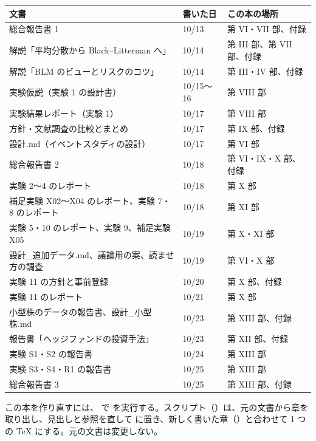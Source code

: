 \begin{longtable}{P{6.4cm}P{3.0cm}P{5.2cm}}
\toprule
\textbf{文書} & \textbf{書いた日} & \textbf{この本の場所} \\
\midrule
\endhead
\bottomrule
\endfoot
総合報告書 1 & 10/13 & 第 VI・VII 部、付録 \\
解説「平均分散から Black--Litterman へ」 & 10/14 & 第 III 部、第 VII 部、付録 \\
解説「BLM のビューとリスクのコツ」 & 10/14 & 第 III・IV 部、付録 \\
実験仮説（実験 1 の設計書） & 10/15〜16 & 第 VIII 部 \\
実験結果レポート（実験 1） & 10/17 & 第 VIII 部 \\
方針・文献調査の比較とまとめ & 10/17 & 第 IX 部、付録 \\
設計.md（イベントスタディの設計） & 10/17 & 第 VI 部 \\
総合報告書 2 & 10/18 & 第 VI・IX・X 部、付録 \\
実験 2〜4 のレポート & 10/18 & 第 X 部 \\
補足実験 X02〜X04 のレポート、実験 7・8 のレポート & 10/18 & 第 XI 部 \\
実験 5・10 のレポート、実験 9、補足実験 X05 & 10/19 & 第 X・XI 部 \\
設計\_追加データ.md、議論用の案、読ませ方の調査 & 10/19 & 第 VI・X 部 \\
実験 11 の方針と事前登録 & 10/20 & 第 X 部、付録 \\
実験 11 のレポート & 10/21 & 第 X 部 \\
小型株のデータの報告書、設計\_小型株.md & 10/23 & 第 XIII 部、付録 \\
報告書「ヘッジファンドの投資手法」 & 10/23 & 第 XII 部、付録 \\
実験 S1・S2 の報告書 & 10/24 & 第 XIII 部 \\
実験 S3・S4・R1 の報告書 & 10/25 & 第 XIII 部 \\
総合報告書 3 & 10/25 & 第 XIII 部、付録 \\
\end{longtable}

この本を作り直すには、 で  を実行する。スクリプト（）は、元の文書から章を取り出し、見出しと参照を直して  に置き、新しく書いた章（）と合わせて 1 つの TeX にする。元の文書は変更しない。
